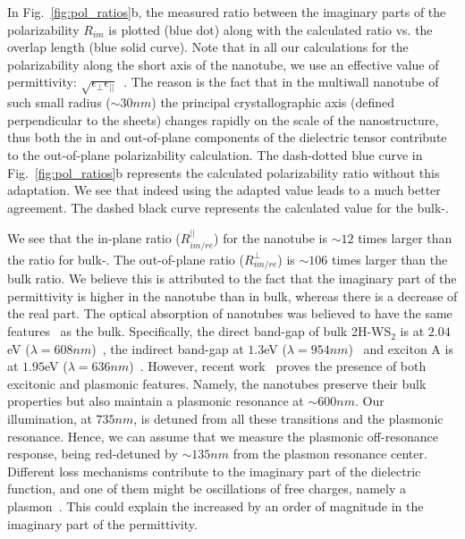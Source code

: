 \documentclass[journal=jacsat,manuscript=article]{achemso}
\begin{document}
In Fig.~\ref{fig:pol_ratios}b, the measured ratio between the imaginary parts of the polarizability $ R_{im}$ is plotted (blue dot) along with the calculated ratio vs. the overlap length (blue solid curve). Note that in all our calculations for the polarizability along the short axis of the nanotube, we use an effective value of permittivity: $\sqrt{\epsilon_{\perp}\epsilon_{||}}$~\cite{taverna2002,kociak2001experimental}. The reason is the fact that in the multiwall nanotube of such small radius ($\sim 30nm$) the principal crystallographic axis (defined perpendicular to the  sheets) changes rapidly on the scale of the nanostructure, thus both the in and out-of-plane components of the dielectric tensor contribute to the out-of-plane polarizability calculation. The dash-dotted blue curve in Fig.~\ref{fig:pol_ratios}b represents the calculated polarizability ratio without this adaptation. We see that indeed using the adapted value leads to a much better agreement. The dashed black curve represents the calculated value for the bulk-.

We see that the in-plane ratio ($R_{im/re}^{||}$) for the  nanotube is $\sim12$ times larger than the ratio for bulk-. The out-of-plane ratio ($R_{im/re}^{\perp}$) is $\sim106$ times larger than the bulk ratio. We believe this is attributed to the fact that the imaginary part of the permittivity is higher in the nanotube than in bulk, whereas there is a decrease of the real part. The optical absorption of nanotubes was believed to have the same features~\cite{frey1998optical} as the bulk. Specifically, the direct band-gap of bulk 2H-WS$_2$ is at $2.04$eV ($\lambda=608nm$)~\cite{wilson1969transition}, the indirect band-gap at $1.3$eV ($\lambda=954nm$)~\cite{ballif1999optical} and exciton A is at $1.95$eV ($\lambda=636nm$)~\cite{frey1998optical}. However, recent work~\cite{Yadgarov2016unique} proves the presence of both excitonic and plasmonic features. Namely, the nanotubes preserve their  bulk properties but also maintain a plasmonic resonance at $\sim 600nm$. Our illumination, at $735nm$, is detuned from all these transitions and the plasmonic resonance. Hence, we can assume that we measure the plasmonic off-resonance response, being red-detuned by $\sim135nm$ from the plasmon resonance center.
Different loss mechanisms contribute to the imaginary part of the dielectric function, and one of them might be oscillations of free charges, namely a plasmon~\cite{Yadgarov2016unique}. This could explain the increased by an order of magnitude in the imaginary part of the permittivity.
\end{document}
